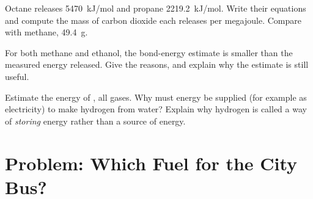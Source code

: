 \begin{exercise}[$\star\star\star$]\label{exo:g11:reaction-energy:13}
Octane releases \qty{5470}{kJ/mol} and propane \qty{2219.2}{kJ/mol}.
Write their  equations and compute the mass of carbon dioxide
each releases per megajoule. Compare with methane, \qty{49.4}{g}.
\end{exercise}

\begin{exercise}[$\star\star\star$]\label{exo:g11:reaction-energy:14}
For both methane and ethanol, the bond-energy estimate is smaller than
the measured energy released. Give the reasons, and explain why the
estimate is still useful.
\end{exercise}

\begin{exercise}[$\star\star\star$]\label{exo:g11:reaction-energy:15}
Estimate the energy of , all gases. Why must energy
be supplied (for example as electricity) to make hydrogen from water?
Explain why hydrogen is called a way of \emph{storing} energy rather than
a source of energy.
\end{exercise}

\section{Problem: Which Fuel for the City Bus?}

